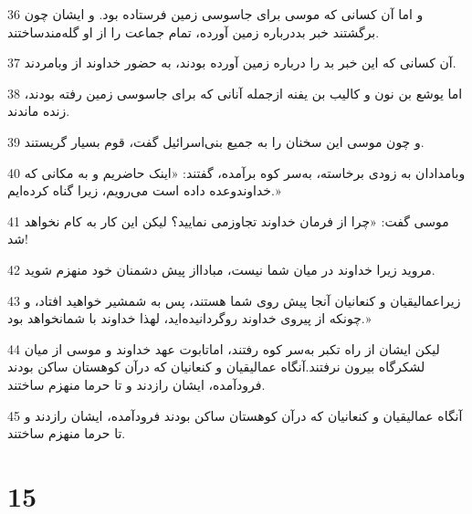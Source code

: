\par 36 و اما آن کسانی که موسی برای جاسوسی زمین فرستاده بود. و ایشان چون برگشتند خبر بددرباره زمین آورده، تمام جماعت را از او گله‌مندساختند.
\par 37 آن کسانی که این خبر بد را درباره زمین آورده بودند، به حضور خداوند از وبامردند.
\par 38 اما یوشع بن نون و کالیب بن یفنه ازجمله آنانی که برای جاسوسی زمین رفته بودند، زنده ماندند.
\par 39 و چون موسی این سخنان را به جمیع بنی‌اسرائیل گفت، قوم بسیار گریستند.
\par 40 وبامدادان به زودی برخاسته، به‌سر کوه برآمده، گفتند: «اینک حاضریم و به مکانی که خداوندوعده داده است می‌رویم، زیرا گناه کرده‌ایم.»
\par 41 موسی گفت: «چرا از فرمان خداوند تجاوزمی نمایید؟ لیکن این کار به کام نخواهد شد!
\par 42 مروید زیرا خداوند در میان شما نیست، مبادااز پیش دشمنان خود منهزم شوید.
\par 43 زیراعمالیقیان و کنعانیان آنجا پیش روی شما هستند، پس به شمشیر خواهید افتاد، و چونکه از پیروی خداوند روگردانیده‌اید، لهذا خداوند با شمانخواهد بود.»
\par 44 لیکن ایشان از راه تکبر به‌سر کوه رفتند، اماتابوت عهد خداوند و موسی از میان لشکرگاه بیرون نرفتند.آنگاه عمالیقیان و کنعانیان که درآن کوهستان ساکن بودند فرودآمده، ایشان رازدند و تا حرما منهزم ساختند.
\par 45 آنگاه عمالیقیان و کنعانیان که درآن کوهستان ساکن بودند فرودآمده، ایشان رازدند و تا حرما منهزم ساختند.
 
\chapter{15}

